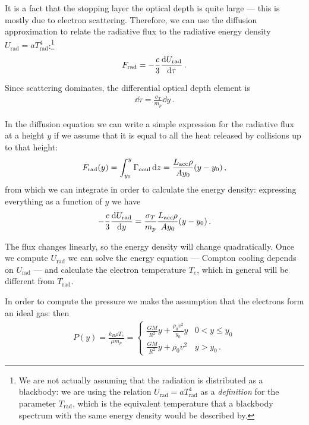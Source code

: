 \documentclass[main.tex]{subfiles}
\begin{document}
It is a fact that the stopping layer the optical depth is quite large --- this is mostly due to electron scattering. 
Therefore, we can use the diffusion approximation to relate the radiative flux to the radiative energy density \(U_{\text{rad}} = a T _{\text{rad}}^{4}\):\footnote{We are not actually assuming that the radiation is distributed as a blackbody: we are using the relation \(U _{\text{rad}} = aT _{\text{rad}}^{4}\) as a \emph{definition} for the parameter \(T _{\text{rad}}\), which is the equivalent temperature that a blackbody spectrum with the same energy density would be described by. }
%
\begin{align}
F _{\text{rad}} = - \frac{c}{3} \dv{U _{\text{rad}}}{\tau }
\,.
\end{align}

Since scattering dominates, the differential optical depth element is 
%
\begin{align}
\dd{\tau } = \frac{\sigma _T}{m_p} \dd{y}
\,.
\end{align}

In the diffusion equation we can write a simple expression for the radiative flux at a height \(y\) if we assume that it is equal to all the heat released by collisions up to that height:
%
\begin{align}
F _{\text{rad}} (y) = \int_{y_0 }^{y} \Gamma _{\text{coul}} \dd{z} 
= \frac{L _{\text{acc}} \rho }{A y_0 } \qty(y - y_0 )
\,,
\end{align}
%
from which we can integrate in order to calculate the energy density: expressing everything as a function of \(y\) we have
%
\begin{align}
- \frac{c}{3} \dv{U _{\text{rad}}}{y } = \frac{\sigma _T}{m_p} \frac{L _{\text{acc}} \rho }{A y_0 } \qty(y - y_0 )
\,.
\end{align}

The flux changes linearly, so the energy density will change quadratically. 
Once we compute \(U _{\text{rad}}\) we can solve the energy equation --- Compton cooling depends on \(U _{\text{rad}}\) --- and calculate the electron temperature \(T_e\), which in general will be different from \(T _{\text{rad}}\). 

In order to compute the pressure we make the assumption that the electrons form an ideal gas: then
%
\begin{align}
P(y) = \frac{k_B \rho T_e}{\mu m_p} = 
\begin{cases}
    \frac{GM}{R^2} y + \frac{\rho_0 v^2}{y_0 } y & 0 < y \leq y_0  \\
    \frac{GM}{R^2} y + \rho_0 v^2 & y > y_0 
\,.
\end{cases}
\end{align}
\end{document}
